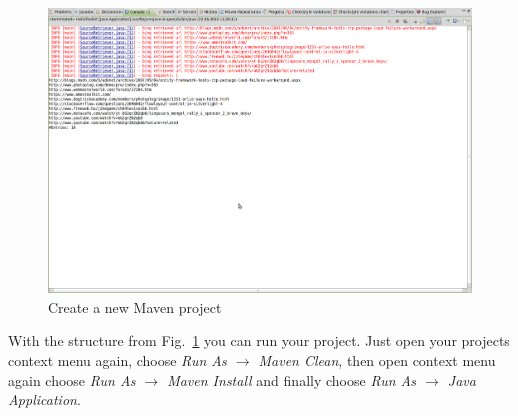 \documentclass[a4paper,twoside]{book}      %
\begin{document}
\begin{figure}
\includegraphics[width=\textwidth]{img/ht14.png}
\caption{Create a new Maven project}
\label{fig:structure}
\end{figure}
With the structure from Fig.~\ref{fig:structure} you can run your project. Just open your projects context menu again, choose \textit{Run As $\rightarrow$ Maven Clean}, then open context menu again choose \textit{Run As $\rightarrow$ Maven Install} and finally choose \textit{Run As $\rightarrow$ Java Application}.
\end{document}
